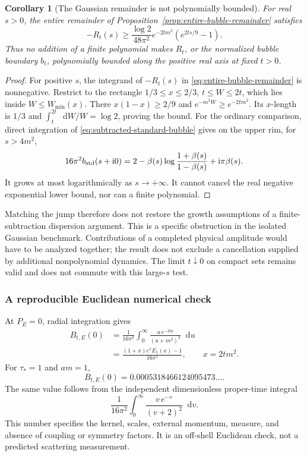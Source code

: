 \documentclass[final,5p,times,twocolumn,numbers,nopreprintline]{elsarticle}
\numberwithin{equation}{section}
\newtheorem{corollary}[theorem]{Corollary}
\theoremstyle{definition}
\theoremstyle{remark}
\newcommand{\dd}{\mathop{}\!\mathrm d}
\newcommand{\ii}{\mathrm i}
\begin{document}
\begin{corollary}[The Gaussian remainder is not polynomially bounded]
\label{cor:Gaussian-growth-obstruction}
For real \(s>0\), the entire remainder of
Proposition~\ref{prop:entire-bubble-remainder} satisfies
\begin{equation}
 -R_t(s)\geq
 \frac{\log2}{48\pi^2}e^{-2tm^2}
       \left(e^{2ts/9}-1\right).
 \label{eq:Gaussian-remainder-growth-lower}
\end{equation}
Thus no addition of a finite polynomial makes \(R_t\), or the
normalized bubble boundary \(b_t\), polynomially bounded along
the positive real axis at fixed \(t>0\).
\end{corollary}

\begin{proof}
For positive \(s\), the integrand of \(-R_t(s)\) in
\eqref{eq:entire-bubble-remainder} is nonnegative. Restrict to the
rectangle \(1/3\leq x\leq2/3\), \(t\leq W\leq2t\),
which lies inside \(W\leq W_{\min}(x)\).
There \(x(1-x)\geq2/9\) and \(e^{-m^2W}\geq e^{-2tm^2}\).
Its \(x\)-length is \(1/3\) and
\(\int_t^{2t}\dd W/W=\log2\), proving the bound.
For the ordinary comparison, direct integration of
\eqref{eq:subtracted-standard-bubble} gives on the upper rim,
for \(s>4m^2\),
\[
 16\pi^2 b_{\rm std}(s+\ii0)
 =2-\beta(s)\log\frac{1+\beta(s)}{1-\beta(s)}
       +\ii\pi\beta(s).
\]
It grows at most logarithmically as \(s\to+\infty\).
It cannot cancel the real negative exponential lower bound, nor
can a finite polynomial.
\end{proof}

Matching the jump therefore does not restore the growth assumptions
of a finite-subtraction dispersion argument. This is a specific
obstruction in the isolated Gaussian benchmark. Contributions of a
completed physical amplitude would have to be analyzed together;
the result does not exclude a cancellation supplied by additional
nonpolynomial dynamics. The limit \(t\downarrow0\) on compact
sets remains valid and does not commute with this large-\(s\) test.

\subsubsection*{A reproducible Euclidean numerical check}

At \(P_E=0\), radial integration gives
\begin{align}
 B_{t,E}(0)
 &=\frac1{16\pi^2}
     \int_0^\infty
       \frac{u\,e^{-2tu}}{(u+m^2)^2}\dd u \nonumber\\
 &=\frac{(1+x)e^xE_1(x)-1}{16\pi^2},
 \qquad x=2tm^2 .
 \label{eq:gaussian-zero}
\end{align}
For \(\tau_*=1\) and \(am=1\),
\begin{equation}
 B_{t,E}(0)=
 0.0005318466124095473\ldots .
 \label{eq:numerical-bubble}
\end{equation}
The same value follows from the independent dimensionless
proper-time integral
\[
 \frac1{16\pi^2}\int_0^\infty
       \frac{v\,e^{-v}}{(v+2)^2}\dd v .
\]
This number specifies the kernel, scales, external momentum,
measure, and absence of coupling or symmetry factors. It is an
off-shell Euclidean check, not a predicted scattering measurement.
\end{document}

